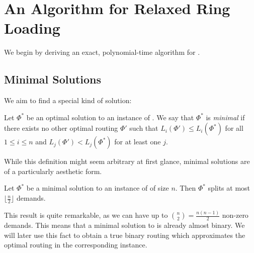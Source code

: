 \section{An Algorithm for Relaxed Ring Loading}
\label{sec:relaxed-ring-loading}

We begin by deriving an exact, polynomial-time algorithm for \RRL.

\subsection{Minimal Solutions}

We aim to find a special kind of solution:

\begin{definition}
	Let $\Phi^\ast$ be an optimal solution to an instance of \RRL.
	We say that $\Phi^\ast$ is \emph{minimal} if there exists no other optimal routing $\Phi'$ such that $L_i(\Phi') \leq L_i(\Phi^\ast)$ for all $1 \leq i \leq n$ and $L_j(\Phi') < L_j(\Phi^\ast)$ for at least one $j$.
\end{definition}
While this definition might seem arbitrary at first glance, minimal solutions are of a particularly aesthetic form.

\begin{theorem}
	\label{theo:number-of-splits}
	Let $\Phi^\ast$ be a minimal solution to an instance of \RRL of size $n$.
	Then $\Phi^\ast$ splits at most $\lfloor \frac{n}{2} \rfloor$ demands.
\end{theorem}

This result is quite remarkable, as we can have up to $\binom{n}{2} = \frac{n(n-1)}{2}$ non-zero demands.
This means that a minimal solution to \RRL is already almost binary.
We will later use this fact to obtain a true binary routing which approximates the optimal routing in the corresponding \RL instance.

